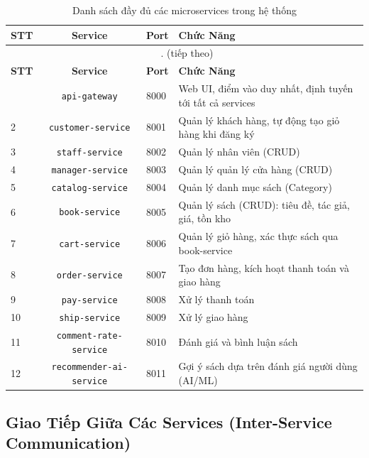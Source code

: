\documentclass[12pt,a4paper]{article}
\begin{document}
\begin{longtable}{lclX}
  \caption{Danh sách đầy đủ các microservices trong hệ thống} \\
  \toprule
  \textbf{STT} & \textbf{Service} & \textbf{Port} & \textbf{Chức Năng} \\
  \midrule
  \endfirsthead
  \multicolumn{4}{c}{\tablename\ \thetable{}. (tiếp theo)} \\
  \toprule
  \textbf{STT} & \textbf{Service} & \textbf{Port} & \textbf{Chức Năng} \\
  \midrule
  \endhead
  \bottomrule
  \endfoot
  1  & \texttt{api-gateway}          & 8000 & Web UI, điểm vào duy nhất, định tuyến tới tất cả services \\[0.3cm]
  2  & \texttt{customer-service}     & 8001 & Quản lý khách hàng, tự động tạo giỏ hàng khi đăng ký \\[0.3cm]
  3  & \texttt{staff-service}        & 8002 & Quản lý nhân viên (CRUD) \\[0.3cm]
  4  & \texttt{manager-service}      & 8003 & Quản lý quản lý cửa hàng (CRUD) \\[0.3cm]
  5  & \texttt{catalog-service}      & 8004 & Quản lý danh mục sách (Category) \\[0.3cm]
  6  & \texttt{book-service}         & 8005 & Quản lý sách (CRUD): tiêu đề, tác giả, giá, tồn kho \\[0.3cm]
  7  & \texttt{cart-service}         & 8006 & Quản lý giỏ hàng, xác thực sách qua book-service \\[0.3cm]
  8  & \texttt{order-service}        & 8007 & Tạo đơn hàng, kích hoạt thanh toán và giao hàng \\[0.3cm]
  9  & \texttt{pay-service}          & 8008 & Xử lý thanh toán \\[0.3cm]
  10 & \texttt{ship-service}         & 8009 & Xử lý giao hàng \\[0.3cm]
  11 & \texttt{comment-rate-service} & 8010 & Đánh giá và bình luận sách \\[0.3cm]
  12 & \texttt{recommender-ai-service} & 8011 & Gợi ý sách dựa trên đánh giá người dùng (AI/ML) \\[0.3cm]
\end{longtable}

\subsection{Giao Tiếp Giữa Các Services (Inter-Service Communication)}
\end{document}
